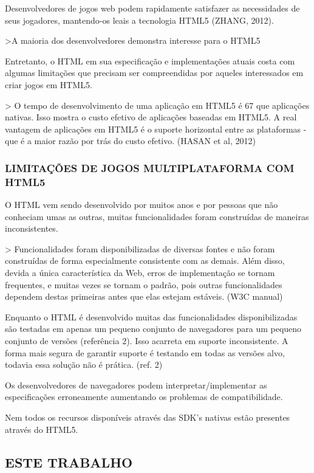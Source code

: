 \documentclass[11pt,a4paper]{article}
\begin{document}
Desenvolvedores de jogos web podem rapidamente satisfazer as
necessidades de seus jogadores, mantendo-os leais a tecnologia HTML5
(ZHANG, 2012).

>A maioria dos desenvolvedores demonstra interesse para o HTML5 

Entretanto, o HTML em sua especificação e implementações atuais
costa com algumas limitações que precisam ser compreendidas por
aqueles interessados em criar jogos em HTML5.

> O tempo de desenvolvimento de uma aplicação em HTML5 é 67%
que aplicações nativas. Isso mostra o custo efetivo de aplicações
baseadas em HTML5. A real vantagem de aplicações em HTML5 é o suporte
horizontal entre as plataformas - que é a maior razão por trás do
custo efetivo. (HASAN et al, 2012)

\subsubsection{LIMITAÇÕES DE JOGOS MULTIPLATAFORMA COM HTML5}

O HTML vem sendo desenvolvido por muitos anos e por pessoas que não
conheciam umas as outras, muitas funcionalidades foram construídas de
maneiras inconsistentes.

> Funcionalidades foram disponibilizadas de diversas fontes e não foram
construídas de forma especialmente consistente com as demais. Além
disso, devida a única característica da Web, erros de implementação
se tornam frequentes, e muitas vezes se tornam o padrão, pois outras
funcionalidades dependem destas primeiras antes que elas estejam
estáveis. (W3C manual)

Enquanto o HTML é desenvolvido muitas das funcionalidades
disponibilizadas são testadas em apenas um pequeno conjunto de
navegadores para um pequeno conjunto de versões (referência 2). Isso
acarreta em suporte inconsistente. A forma mais segura de garantir
suporte é testando em todas as versões alvo, todavia essa solução
não é prática. (ref. 2)

Os desenvolvedores de navegadores podem interpretar/implementar
as especificações erroneamente aumentando os problemas de
compatibilidade.

Nem todos os recursos disponíveis através das SDK's nativas estão
presentes através do HTML5.

\subsection{ ESTE TRABALHO}
\end{document}
